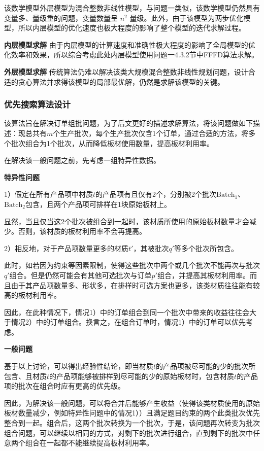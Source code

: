 \documentclass[bwprint]{gmcmthesis}
\begin{document}
    该数学模型外层模型为混合整数非线性模型，与问题一类似，该数学模型仍然具有变量多、量级重的问题，变量数量呈 $ n^2 $ 量级。此外，由于该模型为两步优化模型，所以内层模型的优化速度也极大程度的影响了整个模型的迭代求解过程。
	
	\textbf{内层模型求解} 由于内层模型的计算速度和准确性极大程度的影响了全局模型的优化效率和效果，所以综合考虑此处内层模型使用问题一4.3.2节中FFFD算法求解。
	
	\textbf{外层模型求解} 传统算法仍难以解决该类大规模混合整数非线性规划问题，设计合适的贪心算法并求得该模型的局部最优解，仍然是求解该模型的关键。

\subsubsection{优先搜索算法设计}
该算法旨在解决订单组批问题，为了后文更好的描述求解算法，将该问题做如下描述：现总共有$m$个生产批次，每个生产批次仅含1个订单，通过合适的方法，将多个批次组合为1个批次，从而降低板材使用数量，提高板材利用率。

在解决该一般问题之前，先考虑一组特异性数据。

\textbf{特异性问题}

1）假定在所有产品项中材质$t$的产品项有且仅有2个，分别被2个批次$\text{Batch}_1$、$\text{Batch}_2$包含，且两个产品项可排样在1块原始板材上。

显然，当且仅当这2个批次被组合到一起时，该材质所使用的原始板材数量才会减少。否则，该材质的板材利用率不会再提高。

2）相反地，对于产品项数量更多的材质$t'$，其被批次$q'$等多个批次所包含。

此时，如若因为约束等因素限制，使得这些批次中两个或几个批次不能再次与批次$q'$组合。但是仍然可能会有其他可选批次与订单$p'$组合，并提高其板材利用率。而且由于其产品项数量多、形状多，在排样时可选方案也更多，该类材质往往能有较高的板材利用率。

因此，在此种情况下，情况1）中的订单组合到同一个批次中带来的收益往往会大于情况2）中的订单组合。换言之，在组合订单时，情况1）中的订单可以优先考虑。

\textbf{一般问题}

基于以上讨论，可以得出经验性结论，即当材质$t$的产品项被尽可能的少的批次所包含、且材质$t$的产品项能够被排样到尽可能的少的原始板材时，包含材质$t$的产品项的批次在组合时应有更高的优先级。

因此，为解决该一般问题，可以将合并后能够产生收益（使得该类材质使用的原始板材数量减少，例如特异性问题中的情况1））且满足题目约束的两个此类批次优先整合到一起。组合后，这两个批次转换为一个批次，于是，该问题再次转变为批次组合问题，可以继续以相同的方式，对剩下的批次进行组合，直到剩下的批次中任意两个组合在一起都不能继续提高板材利用率。
\end{document}
